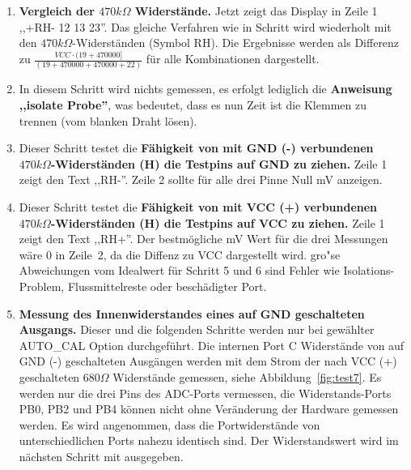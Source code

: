 \begin{enumerate}
\item {\bf Vergleich der \(470k\Omega\) Widerst\"ande.}
Jetzt zeigt das Display in Zeile 1 ,,+RH- 12 13 23''. Das gleiche Verfahren wie in Schritt wird wiederholt mit den
 \(470k\Omega\)-Widerst\"anden (Symbol RH).
Die Ergebnisse werden als Differenz zu  \(\frac{VCC \cdot (19 + 470000]}{ (19 + 470000 + 470000 + 22)} \) f\"ur alle Kombinationen dargestellt.
\item In diesem Schritt wird nichts gemessen, es erfolgt lediglich die {\bf Anweisung ,,isolate Probe''},
was bedeutet, dass es nun Zeit ist die Klemmen zu trennen (vom blanken Draht l\"osen).
\item Dieser Schritt testet die {\bf F\"ahigkeit von mit GND (-) verbundenen \(470k\Omega\)-Widerst\"anden (H) die Testpins auf GND zu ziehen.}
Zeile 1 zeigt den Text ,,RH-''.
Zeile 2 sollte f\"ur alle drei Pinne  Null mV anzeigen.
\item Dieser Schritt testet die {\bf F\"ahigkeit von mit VCC (+) verbundenen \(470k\Omega\)-Widerst\"anden (H) die Testpins auf VCC zu ziehen.}
Zeile 1 zeigt den Text ,,RH+''.
Der bestm\"ogliche mV Wert f\"ur die drei Messungen w\"are 0 in Zeile~2, da die Diffenz zu VCC dargestellt wird.
 gro"se Abweichungen vom Idealwert f\"ur Schritt 5 und 6 sind Fehler wie Isolations-Problem, Flussmittelreste oder besch\"adigter Port.
\item {\bf Messung des Innenwiderstandes eines auf GND geschalteten Ausgangs.}
Dieser und die folgenden Schritte werden nur bei gew\"ahlter AUTO\_CAL Option durchgef\"uhrt.
Die internen Port C Widerst\"ande von auf GND (-) geschalteten Ausg\"angen werden mit dem Strom
der nach VCC (+) geschalteten \(680\Omega\) Widerst\"ande gemessen, siehe Abbildung~\ref{fig:test7}.
Es werden nur die drei Pins des ADC-Ports vermessen, die Widerstands-Ports  PB0, PB2 und PB4 k\"onnen nicht
ohne Ver\"anderung der Hardware gemessen werden.
Es wird angenommen, dass die Portwiderst\"ande von unterschiedlichen Ports nahezu identisch sind.
Der Widerstandswert wird im n\"achsten Schritt mit ausgegeben.
\begin{figure}[H]
\centering

\end{figure}
\end{enumerate}
